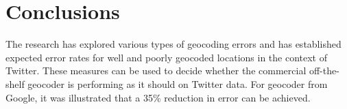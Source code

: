 \section{Conclusions}
The research has explored various types of geocoding errors and has established expected error rates for well and poorly geocoded locations in the context of Twitter. These measures can be used to decide whether the commercial off-the-shelf geocoder is performing as it should on Twitter data. For geocoder from Google, it was illustrated that a 35\% reduction in error can be achieved. 




